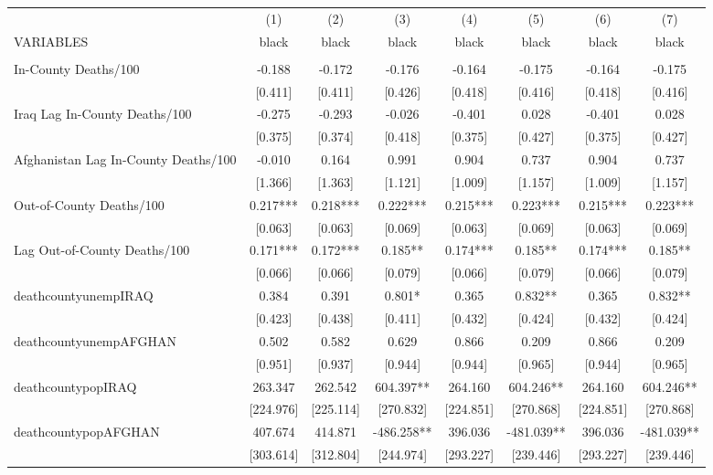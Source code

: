 \documentclass[]{article}
\begin{document}
\begin{tabular}{lccccccc} \hline
 & (1) & (2) & (3) & (4) & (5) & (6) & (7) \\
VARIABLES & black & black & black & black & black & black & black \\ \hline
 &  &  &  &  &  &  &  \\
In-County Deaths/100 & -0.188 & -0.172 & -0.176 & -0.164 & -0.175 & -0.164 & -0.175 \\
 & [0.411] & [0.411] & [0.426] & [0.418] & [0.416] & [0.418] & [0.416] \\
Iraq Lag In-County Deaths/100 & -0.275 & -0.293 & -0.026 & -0.401 & 0.028 & -0.401 & 0.028 \\
 & [0.375] & [0.374] & [0.418] & [0.375] & [0.427] & [0.375] & [0.427] \\
Afghanistan Lag In-County Deaths/100 & -0.010 & 0.164 & 0.991 & 0.904 & 0.737 & 0.904 & 0.737 \\
 & [1.366] & [1.363] & [1.121] & [1.009] & [1.157] & [1.009] & [1.157] \\
Out-of-County Deaths/100 & 0.217*** & 0.218*** & 0.222*** & 0.215*** & 0.223*** & 0.215*** & 0.223*** \\
 & [0.063] & [0.063] & [0.069] & [0.063] & [0.069] & [0.063] & [0.069] \\
Lag Out-of-County Deaths/100 & 0.171*** & 0.172*** & 0.185** & 0.174*** & 0.185** & 0.174*** & 0.185** \\
 & [0.066] & [0.066] & [0.079] & [0.066] & [0.079] & [0.066] & [0.079] \\
deathcountyunempIRAQ & 0.384 & 0.391 & 0.801* & 0.365 & 0.832** & 0.365 & 0.832** \\
 & [0.423] & [0.438] & [0.411] & [0.432] & [0.424] & [0.432] & [0.424] \\
deathcountyunempAFGHAN & 0.502 & 0.582 & 0.629 & 0.866 & 0.209 & 0.866 & 0.209 \\
 & [0.951] & [0.937] & [0.944] & [0.944] & [0.965] & [0.944] & [0.965] \\
deathcountypopIRAQ & 263.347 & 262.542 & 604.397** & 264.160 & 604.246** & 264.160 & 604.246** \\
 & [224.976] & [225.114] & [270.832] & [224.851] & [270.868] & [224.851] & [270.868] \\
deathcountypopAFGHAN & 407.674 & 414.871 & -486.258** & 396.036 & -481.039** & 396.036 & -481.039** \\
 & [303.614] & [312.804] & [244.974] & [293.227] & [239.446] & [293.227] & [239.446] \\

\end{tabular}
\end{document}
